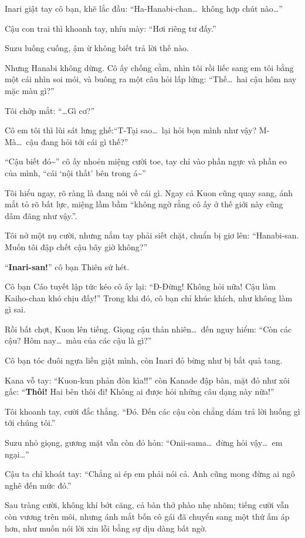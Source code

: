 \documentclass[../main.tex]{subfiles}
\begin{document}
Inari giật tay cô bạn, khẽ lắc đầu: ``Ha-Hanabi-chan\dots\ không hợp chút nào\dots ''

Cậu con trai thì khoanh tay, nhíu mày: ``Hơi riêng tư đấy.''

Suzu luống cuống, ậm ừ không biết trả lời thế nào.

Nhưng Hanabi không dừng. Cô ấy chống cằm, nhìn tôi rồi liếc sang em tôi bằng một cái nhìn soi mói, và buông ra một câu hỏi lấp lửng: ``Thế\dots\ hai cậu hôm nay mặc màu gì?''

Tôi chớp mắt: ``\dots Gì cơ?''

Cô em tôi thì lùi sát lưng ghế:``T-Tại sao\dots\ lại hỏi bọn mình như vậy? M-Mà\dots\ cậu đang hỏi tới cái gì thế?''

``Cậu biết đó\~{}'' cô ấy nhoẻn miệng cười toe, tay chỉ vào phần ngực và phần eo của mình, ``cái `nội thất' bên trong á\~{}''

Tôi hiểu ngay, rõ ràng là đang nói về cái gì. Ngay cả Kuon cũng quay sang, ánh mắt tỏ rõ bất lực, miệng lầm bầm ``không ngờ rằng cô ấy ở thế giới này cũng dâm đãng như vậy.''.

Tôi nở một nụ cười, nhưng nắm tay phải siết chặt, chuẩn bị giơ lên: ``Hanabi-san. Muốn tôi đập chết cậu bây giờ không?''

``\textbf{Inari-san!}'' cô bạn Thiên sứ hét.

Cô bạn Cáo tuyết lập tức kéo cô ấy lại: ``Đ-Đừng! Không hỏi nữa! Cậu làm Kaiho-chan khó chịu đấy!'' Trong khi đó, cô bạn chỉ khúc khích, như không làm gì sai.

Rồi bất chợt, Kuon lên tiếng. Giọng cậu thản nhiên\dots\ đến nguy hiểm: ``Còn các cậu? Hôm nay\dots\ màu của các cậu là gì?''

Cô bạn tóc đuôi ngựa liền giật mình, còn Inari đỏ bừng như bị bắt quả tang.

Kana vỗ tay: ``Kuon-kun phản đòn kìa!!'' còn Kanade đập bàn, mặt đỏ như xôi gấc: ``\textbf{Thôi!} Hai bên thôi đi! Không ai được hỏi những câu dạng này nữa!''

Tôi khoanh tay, cười đắc thắng. ``Đó. Đến các cậu còn chẳng dám trả lời huống gì tới chúng tôi.''

Suzu nhỏ giọng, gương mặt vẫn còn đỏ hỏn: ``Onii-sama\dots\ đừng hỏi vậy\dots\ em ngại\dots''

Cậu ta chỉ khoát tay: ``Chẳng ai ép em phải nói cả. Anh cũng mong đừng ai ngô nghê đến mức đó.''

Sau tràng cười, không khí bớt căng, cả bàn thở phào nhẹ nhõm; tiếng cười vẫn còn vương trên môi, nhưng ánh mắt bốn cô gái đã chuyển sang một thứ ấm áp hơn, như muốn nói lời xin lỗi bằng sự dịu dàng bất ngờ.
\end{document}
